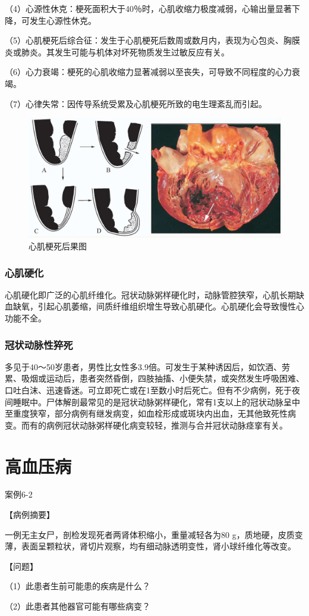 （4）心源性休克：梗死面积大于40％时，心肌收缩力极度减弱，心输出量显著下降，可发生心源性休克。

（5）心肌梗死后综合征：发生于心肌梗死后数周或数月内，表现为心包炎、胸膜炎或肺炎。其发生可能与机体对坏死物质发生过敏反应有关。

（6）心力衰竭：梗死的心肌收缩力显著减弱以至丧失，可导致不同程度的心力衰竭。

（7）心律失常：因传导系统受累及心肌梗死所致的电生理紊乱而引起。

\begin{figure}[!htbp]
    \centering
    \includegraphics{./images/Image00098.jpg}
    \captionsetup{justification=centering}
    \caption{心肌梗死后果图}
    \label{fig6-6}
\end{figure}

\subsubsection{心肌硬化}

心肌硬化即广泛的心肌纤维化。冠状动脉粥样硬化时，动脉管腔狭窄，心肌长期缺血缺氧，引起心肌萎缩，间质纤维组织增生导致心肌硬化。心肌硬化会导致慢性心功能不全。

\subsubsection{冠状动脉性猝死}

多见于40～50岁患者，男性比女性多3.9倍。可发生于某种诱因后，如饮酒、劳累、吸烟或运动后，患者突然昏倒，四肢抽搐、小便失禁，或突然发生呼吸困难、口吐白沫、迅速昏迷。可立即死亡或在1至数小时后死亡。但有不少病例，死于夜间睡眠中。尸体解剖最常见的是冠状动脉粥样硬化，常有1支以上的冠状动脉呈中至重度狭窄，部分病例有继发病变，如血栓形成或斑块内出血，无其他致死性病变。而有的病例冠状动脉粥样硬化病变较轻，推测与合并冠状动脉痉挛有关。

\section{高血压病}
\begin{framed}
    {案例6-2}

    {【病例摘要】}

    一例无主女尸，剖检发现死者两肾体积缩小，重量减轻各为80
    g，质地硬，皮质变薄，表面呈颗粒状，肾切片观察，均有细动脉透明变性，肾小球纤维化等改变。

    {【问题】}

    （1）此患者生前可能患的疾病是什么？

    （2）此患者其他器官可能有哪些病变？
\end{framed}

